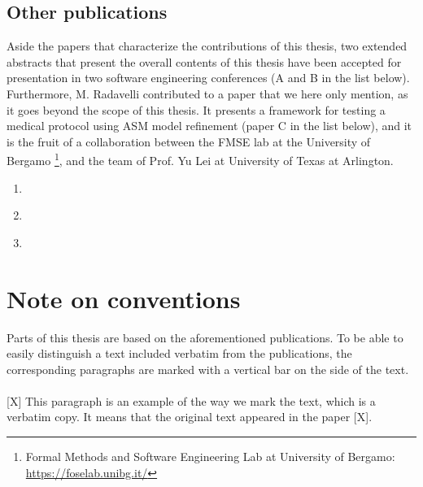 \subsection{Other publications}

Aside the papers that characterize the contributions of this thesis, two extended abstracts that present the overall contents of this thesis have been accepted for presentation in two software engineering conferences (A and B in the list below).
Furthermore, M. Radavelli contributed to a paper that we here only mention, as it goes beyond the scope of this thesis. It presents a framework for testing a medical protocol using ASM model refinement (paper C in the list below), and it is the fruit of a collaboration between the FMSE lab at the University of Bergamo \footnote{Formal Methods and Software Engineering Lab at University of Bergamo: \url{https://foselab.unibg.it/}}, and the  team of Prof. Yu Lei at University of Texas at Arlington.

\begin{enumerate}
	\renewcommand{\theenumi}{\Alph{enumi}} %
	\item \cite{radavelli2019using} 
	
	\item \cite{Radavelli:2019:UST:3338906.3342508} 
	
	\item \cite{bonfanti_ictss_2019} 
\end{enumerate}

\section{Note on conventions}
Parts of this thesis are based on the aforementioned publications. To be able to easily distinguish a text included verbatim from the publications, the corresponding paragraphs are marked with a vertical bar on the side of the text.

\paragraph{}
\begin{tikzborder}{[X]}
This paragraph is an example of the way we mark the text, which is a verbatim copy. It means that the original text appeared in the paper [X].
\end{tikzborder}

